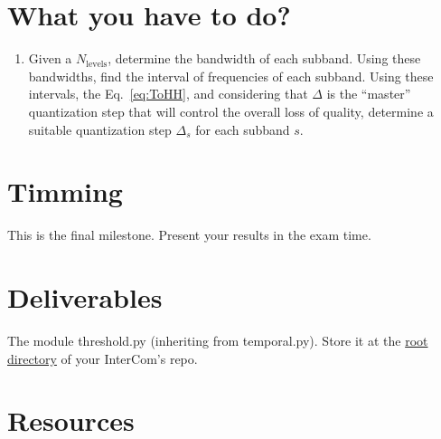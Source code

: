 \section{What you have to do?}

\begin{enumerate}
\item Given a $N_{\text{levels}}$, determine the bandwidth of each
  subband. Using these bandwidths, find the interval of frequencies of
  each subband. Using these intervals, the Eq.~\ref{eq:ToHH}, and
  considering that $\Delta$ is the ``master'' quantization step that
  will control the overall loss of quality, determine a suitable
  quantization step $\Delta_s$ for each subband $s$.
\end{enumerate}

\section{Timming}

This is the final milestone. Present your results in the exam time.

\section{Deliverables}

The module threshold.py (inheriting from temporal.py). Store it at the
\href{https://github.com/Tecnologias-multimedia/intercom}{root
  directory} of your InterCom's repo.

\section{Resources}



